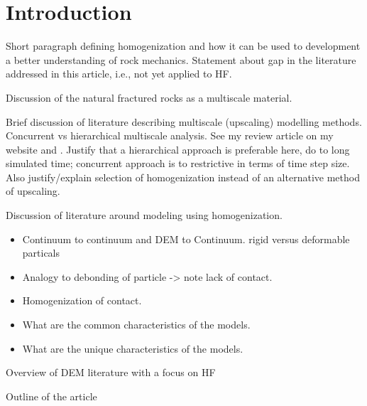 \section{Introduction}
Short paragraph defining homogenization and how it can be used to development a better understanding of rock mechanics.  Statement about gap in the literature addressed in this article, i.e., not yet applied to HF.

Discussion of the natural fractured rocks as a multiscale material.

Brief discussion of literature describing multiscale (upscaling)  modelling methods.  Concurrent vs hierarchical multiscale analysis.  See my review article on my website and \cite{Gracie_2011}. Justify that a hierarchical approach is preferable here, do to long simulated time; concurrent approach is to restrictive in terms of time step size. Also justify/explain selection of homogenization instead of an alternative method of upscaling.

Discussion of literature around modeling using homogenization.
\begin{itemize}
\item Continuum to continuum and DEM to Continuum. rigid versus deformable particals
\item Analogy to debonding of particle -> note lack of contact.
\item Homogenization of contact.
\item What are the common characteristics of the models.
\item What are the unique characteristics of the models.  
\end{itemize} 

Overview of DEM literature with a focus on HF

Outline of the article